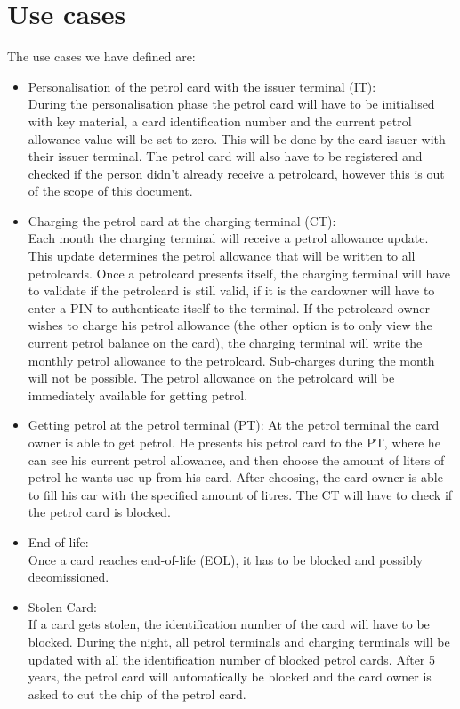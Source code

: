 
\section{Use cases}
The use cases we have defined are:
\begin{itemize}

\item Personalisation of the petrol card with the issuer terminal (IT):\\
During the personalisation phase the petrol card will have to be initialised with key material, a card identification number and the current petrol allowance value will be set to zero. This will be done by the card issuer with their issuer terminal. The petrol card will also have to be registered and checked if the person didn't already receive a petrolcard, however this is out of the scope of this document.

\item Charging the petrol card at the charging terminal (CT): \\
Each month the charging terminal will receive a petrol allowance update. This update determines the petrol allowance that will be written to all petrolcards. Once a petrolcard presents itself, the charging terminal will have to validate if the petrolcard is still valid, if it is the cardowner will have to enter a PIN to authenticate itself to the terminal. If the petrolcard owner wishes to charge his petrol allowance (the other option is to only view the current petrol balance on the card),   the charging terminal will write the monthly petrol allowance to the petrolcard. Sub-charges during the month will not be possible. The petrol allowance on the petrolcard will be immediately available for getting petrol. 

\item Getting petrol at the petrol terminal (PT):
At the petrol terminal the card owner is able to get petrol. He presents his petrol card to the PT, where he can see his current petrol allowance, and then choose the amount of liters of petrol he wants use up from his card. After choosing, the card owner is able to fill his car with the specified amount of litres. The CT will have to check if the petrol card is blocked.

\item End-of-life: \\
Once a card reaches end-of-life (EOL), it has to be blocked and possibly decomissioned. 

\item Stolen Card: \\
If a card gets stolen, the identification number of the card will have to be blocked. During the night, all petrol terminals and charging terminals will be updated with all the identification number of blocked petrol cards. After 5 years, the petrol card will automatically be blocked and the card owner is asked to cut the chip of the petrol card.

\end{itemize}